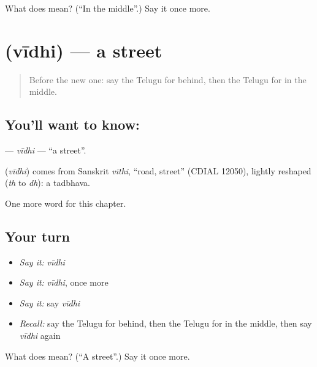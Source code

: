 \begin{tcolorbox}[breakable,colback=teal!4,colframe=teal!35!black,title={Before you move on}]
What does  mean? (\textquotedblleft{}In the middle\textquotedblright{}.) Say it once more.
\end{tcolorbox}
\section[\texorpdfstring{\te{వీధి} (vīdhi)}{వీధి (vīdhi)}]{ (vīdhi) — a street}

\label{lesson:TE-C102-vidhi}



\begin{quote}
Before the new one: say the Telugu for behind, then the Telugu for in the middle.
\end{quote}

\subsection*{You'll want to know: }
\textbf{} — \emph{vīdhi} — \textquotedblleft{}a street\textquotedblright{}.

\begin{cousinweb}
\textbf{} (\emph{vīdhi}) comes from Sanskrit \emph{vīthi}, \textquotedblleft{}road, street\textquotedblright{} (CDIAL 12050), lightly reshaped (\emph{th} to \emph{dh}): a tadbhava.
\end{cousinweb}

\begin{grammarlens}[title={What you've built}]
One more word for this chapter.
\end{grammarlens}

\subsection*{Your turn}
\begin{itemize}
\raggedright
  \item \emph{Say it:} \emph{vīdhi}
  \item \emph{Say it:} \emph{vīdhi}, once more
  \item \emph{Say it:} say \emph{vīdhi}
  \item \emph{Recall:} say the Telugu for behind, then the Telugu for in the middle, then say \emph{vīdhi} again
\end{itemize}

\begin{tcolorbox}[breakable,colback=teal!4,colframe=teal!35!black,title={Before you move on}]
What does  mean? (\textquotedblleft{}A street\textquotedblright{}.) Say it once more.
\end{tcolorbox}
